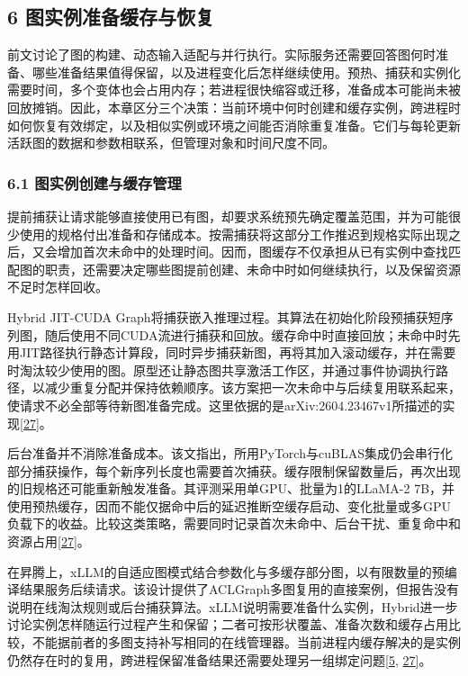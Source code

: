 \documentclass[UTF8,11pt,fontset=windows]{ctexart}
\begin{document}
\hypertarget{section-6}{%
\subsection{6 图实例准备缓存与恢复}\label{section-6}}

前文讨论了图的构建、动态输入适配与并行执行。实际服务还需要回答图何时准备、哪些准备结果值得保留，以及进程变化后怎样继续使用。预热、捕获和实例化需要时间，多个变体也会占用内存；若进程很快缩容或迁移，准备成本可能尚未被回放摊销。因此，本章区分三个决策：当前环境中何时创建和缓存实例，跨进程时如何恢复有效绑定，以及相似实例或环境之间能否消除重复准备。它们与每轮更新活跃图的数据和参数相联系，但管理对象和时间尺度不同。

\hypertarget{section-6-1}{%
\subsubsection{6.1 图实例创建与缓存管理}\label{section-6-1}}

提前捕获让请求能够直接使用已有图，却要求系统预先确定覆盖范围，并为可能很少使用的规格付出准备和存储成本。按需捕获将这部分工作推迟到规格实际出现之后，又会增加首次未命中的处理时间。因而，图缓存不仅承担从已有实例中查找匹配图的职责，还需要决定哪些图提前创建、未命中时如何继续执行，以及保留资源不足时怎样回收。

Hybrid JIT-CUDA Graph将捕获嵌入推理过程。其算法在初始化阶段预捕获短序列图，随后使用不同CUDA流进行捕获和回放。缓存命中时直接回放；未命中时先用JIT路径执行静态计算段，同时异步捕获新图，再将其加入滚动缓存，并在需要时淘汰较少使用的图。原型还让静态图共享激活工作区，并通过事件协调执行路径，以减少重复分配并保持依赖顺序。该方案把一次未命中与后续复用联系起来，使请求不必全部等待新图准备完成。这里依据的是arXiv:2604.23467v1所描述的实现\protect\hyperlink{ref-27}{{[}27{]}}。

后台准备并不消除准备成本。该文指出，所用PyTorch与cuBLAS集成仍会串行化部分捕获操作，每个新序列长度也需要首次捕获。缓存限制保留数量后，再次出现的旧规格还可能重新触发准备。其评测采用单GPU、批量为1的LLaMA-2 7B，并使用预热缓存，因而不能仅据命中后的延迟推断空缓存启动、变化批量或多GPU负载下的收益。比较这类策略，需要同时记录首次未命中、后台干扰、重复命中和资源占用\protect\hyperlink{ref-27}{{[}27{]}}。

在昇腾上，xLLM的自适应图模式结合参数化与多缓存部分图，以有限数量的预编译结果服务后续请求。该设计提供了ACLGraph多图复用的直接案例，但报告没有说明在线淘汰规则或后台捕获算法。xLLM说明需要准备什么实例，Hybrid进一步讨论实例怎样随运行过程产生和保留；二者可按形状覆盖、准备次数和缓存占用比较，不能据前者的多图支持补写相同的在线管理器。当前进程内缓存解决的是实例仍然存在时的复用，跨进程保留准备结果还需要处理另一组绑定问题\protect\hyperlink{ref-5}{{[}5}, \protect\hyperlink{ref-27}{27{]}}。
\end{document}
